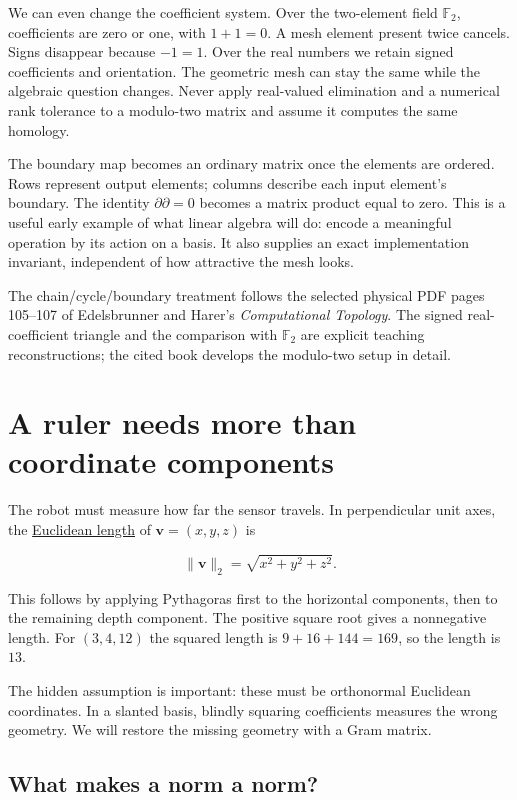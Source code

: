 We can even change the coefficient system. Over the two-element field \(\mathbb F_2\), coefficients are zero or one, with \(1+1=0\). A mesh element present twice cancels. Signs disappear because \(-1=1\). Over the real numbers we retain signed coefficients and orientation. The geometric mesh can stay the same while the algebraic question changes. Never apply real-valued elimination and a numerical rank tolerance to a modulo-two matrix and assume it computes the same homology.

The boundary map becomes an ordinary matrix once the elements are ordered. Rows represent output elements; columns describe each input element's boundary. The identity \(\partial\partial=0\) becomes a matrix product equal to zero. This is a useful early example of what linear algebra will do: encode a meaningful operation by its action on a basis. It also supplies an exact implementation invariant, independent of how attractive the mesh looks.

The chain/cycle/boundary treatment follows the selected physical PDF pages 105--107 of Edelsbrunner and Harer's \emph{Computational Topology}. The signed real-coefficient triangle and the comparison with \(\mathbb F_2\) are explicit teaching reconstructions; the cited book develops the modulo-two setup in detail.

\section{A ruler needs more than coordinate components}\label{01-foundations-i-ch017-a-ruler-needs-more-than-coordinate-components}

The robot must measure how far the sensor travels. In perpendicular unit axes, the \hyperref[01-foundations-i-ch017-a-ruler-needs-more-than-coordinate-components]{Euclidean length} of \(\mathbf v=(x,y,z)\) is

\[
\|\mathbf v\|_2=\sqrt{x^2+y^2+z^2}.
\]

This follows by applying Pythagoras first to the horizontal components, then to the remaining depth component. The positive square root gives a nonnegative length. For \((3,4,12)\) the squared length is \(9+16+144=169\), so the length is \(13\).

The hidden assumption is important: these must be orthonormal Euclidean coordinates. In a slanted basis, blindly squaring coefficients measures the wrong geometry. We will restore the missing geometry with a Gram matrix.

\subsection{What makes a norm a norm?}\label{01-foundations-i-ch017-what-makes-a-norm-a-norm}


